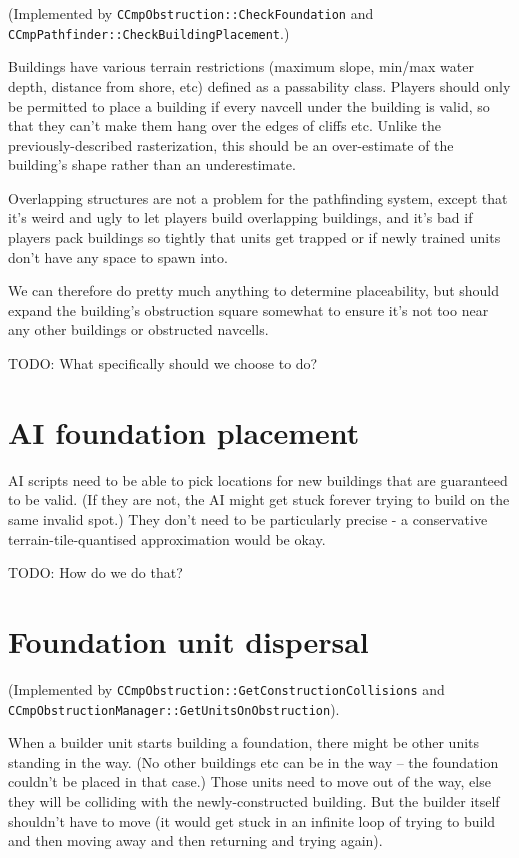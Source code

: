 \documentclass[a4paper,10pt]{article}
\begin{document}
(Implemented by \texttt{CCmpObstruction::CheckFoundation}
and \texttt{CCmpPathfinder::CheckBuildingPlacement}.)

Buildings have various terrain restrictions (maximum slope,
min/max water depth, distance from shore, etc)
defined as a passability class.
Players should only be permitted to place a building if every navcell
under the building is valid,
so that they can't make them hang over the edges of cliffs etc.
Unlike the previously-described rasterization,
this should be an over-estimate of the building's shape
rather than an underestimate.

Overlapping structures are not a problem for the pathfinding system,
except that it's weird and ugly to let players build overlapping buildings,
and it's bad if players pack buildings so tightly that units get trapped
or if newly trained units don't have any space to spawn into.

We can therefore do pretty much anything to determine placeability,
but should expand the building's obstruction square somewhat to ensure
it's not too near any other buildings or obstructed navcells.

TODO: What specifically should we choose to do?

\section{AI foundation placement}

AI scripts need to be able to pick locations for new buildings that are guaranteed
to be valid. (If they are not, the AI might get stuck forever trying to build on the
same invalid spot.)
They don't need to be particularly precise - a conservative terrain-tile-quantised approximation
would be okay.

TODO: How do we do that?

\section{Foundation unit dispersal}

(Implemented by \texttt{CCmpObstruction::GetConstructionCollisions}
and \texttt{CCmpObstructionManager::GetUnitsOnObstruction}).

When a builder unit starts building a foundation,
there might be other units standing in the way.
(No other buildings etc can be in the way -- the foundation couldn't be placed in that case.)
Those units need to move out of the way,
else they will be colliding with the newly-constructed building.
But the builder itself shouldn't have to move
(it would get stuck in an infinite loop of trying to build and then moving away and then returning and trying again).
\end{document}
